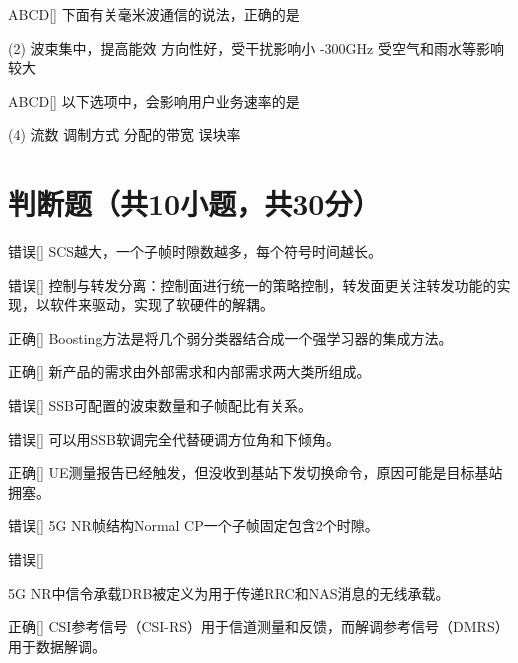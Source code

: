 \begin{choice}{\;ABCD\;}[]
	下面有关毫米波通信的说法，正确的是
	\begin{tasks}(2)
		\task 波束集中，提高能效
		\task 方向性好，受干扰影响小
		-300GHz
		\task 受空气和雨水等影响较大
	\end{tasks}
\end{choice}

\begin{choice}{\;ABCD\;}[]
	以下选项中，会影响用户业务速率的是
	\begin{tasks}(4)
		\task 流数
		\task 调制方式
		\task 分配的带宽
		\task 误块率
	\end{tasks}
\end{choice}




\section{判断题（共10小题，共30分）}
\begin{choice}{\;错误\;}[]
	SCS越大，一个子帧时隙数越多，每个符号时间越长。
\end{choice}


\begin{choice}{\;错误\;}[]
	控制与转发分离：控制面进行统一的策略控制，转发面更关注转发功能的实现，以软件来驱动，实现了软硬件的解耦。
\end{choice}

\begin{choice}{\;正确\;}[]
	Boosting方法是将几个弱分类器结合成一个强学习器的集成方法。
\end{choice}

\begin{choice}{\;正确\;}[]
	新产品的需求由外部需求和内部需求两大类所组成。
\end{choice}

\begin{choice}{\;错误\;}[]
	SSB可配置的波束数量和子帧配比有关系。
\end{choice}

\begin{choice}{\;错误\;}[]
	可以用SSB软调完全代替硬调方位角和下倾角。

\end{choice}


\begin{choice}{\;正确\;}[]
	UE测量报告已经触发，但没收到基站下发切换命令，原因可能是目标基站拥塞。

\end{choice}

\begin{choice}{\;错误\;}[]
	5G NR帧结构Normal CP一个子帧固定包含2个时隙。

\end{choice}

\begin{choice}{\;错误\;}[]

	5G NR中信令承载DRB被定义为用于传递RRC和NAS消息的无线承载。
\end{choice}



\begin{choice}{\;正确\;}[]
	CSI参考信号（CSI-RS）用于信道测量和反馈，而解调参考信号（DMRS）用于数据解调。

\end{choice}











